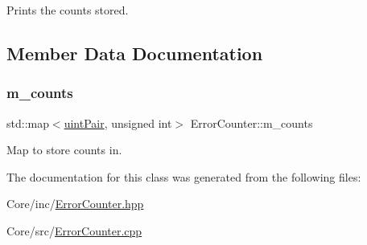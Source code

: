 Prints the counts stored. 



\subsection{Member Data Documentation}
\mbox{\label{class_error_counter_a66d01d8e49111d2f433b56bf922c418e}} 
\subsubsection{\texorpdfstring{m\+\_\+counts}{m\_counts}}
{\footnotesize\ttfamily std\+::map$<$\hyperlink{class_error_counter_aa50fc471c675ff8d626b982d1d90c7b4}{uint\+Pair}, unsigned int$>$ Error\+Counter\+::m\+\_\+counts\hspace{0.3cm}{\ttfamily [private]}}



Map to store counts in. 



The documentation for this class was generated from the following files\+:\begin{DoxyCompactItemize}
\item 
Core/inc/\hyperlink{_error_counter_8hpp}{Error\+Counter.\+hpp}\item 
Core/src/\hyperlink{_error_counter_8cpp}{Error\+Counter.\+cpp}\end{DoxyCompactItemize}
